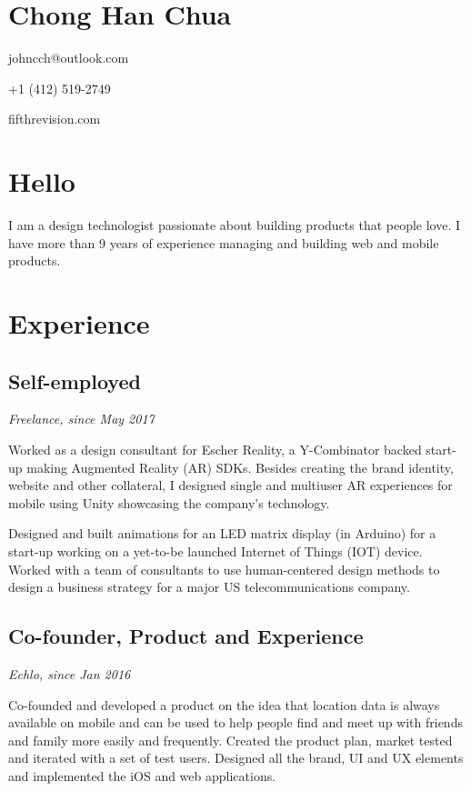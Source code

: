 \section[chong-han-chua]{Chong Han Chua}

\startitemize[packed]
\item
  johncch@outlook.com
\item
  +1 (412) 519-2749
\item
  fifthrevision.com
\stopitemize

\section[hello]{Hello}

I am a design technologist passionate about building products that
people love. I have more than 9 years of experience managing and
building web and mobile products.

\section[experience]{Experience}

\subsection[self-employed]{Self-employed}

{\em Freelance, since May 2017}

Worked as a design consultant for Escher Reality, a Y-Combinator backed
start-up making Augmented Reality (AR) SDKs. Besides creating the brand
identity, website and other collateral, I designed single and multiuser
AR experiences for mobile using Unity showcasing the company's
technology.

Designed and built animations for an LED matrix display (in Arduino) for
a start-up working on a yet-to-be launched Internet of Things (IOT)
device. Worked with a team of consultants to use human-centered design
methods to design a business strategy for a major US telecommunications
company.

\subsection[co-founder-product-and-experience]{Co-founder, Product and
Experience}

{\em Echlo, since Jan 2016}

Co-founded and developed a product on the idea that location data is
always available on mobile and can be used to help people find and meet
up with friends and family more easily and frequently. Created the
product plan, market tested and iterated with a set of test users.
Designed all the brand, UI and UX elements and implemented the iOS and
web applications.

